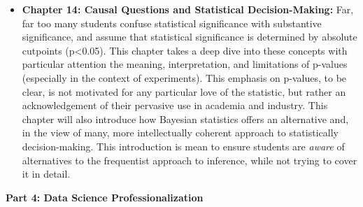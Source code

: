 \documentclass[12pt]{article}
\begin{document}
\begin{itemize}
{  Deployment:} One of the hardest parts of answering Causal Questions is
  that data scientists are called in to answer them in contexts where
  the stakes are too high to try things at a large scale. This chapter
  focuses on the issues of external validity --- such as general
  equilibrium effects, novelty and primacy effects, etc. --- that arise
  when one attempts to generalize the results of causal analyses. This
  section is of particular interest to data scientists, many of whom
  have the privilege of working at companies with A/B testing
  infrastructure that radically simplifies the challenge of ensuring
  high internal validity, and who are likely to have had internal
  validity emphasized in courses.
\item
  \textbf{Chapter 14: Causal Questions and Statistical Decision-Making:}
  Far, far too many students confuse statistical significance with
  substantive significance, and assume that statistical significance is
  determined by absolute cutpoints (p\textless0.05). This chapter takes
  a deep dive into these concepts with particular attention the meaning,
  interpretation, and limitations of p-values (especially in the context
  of experiments). This emphasis on p-values, to be clear, is not
  motivated for any particular love of the statistic, but rather an
  acknowledgement of their pervasive use in academia and industry. This
  chapter will also introduce how Bayesian statistics offers an
  alternative and, in the view of many, more intellectually coherent
  approach to statistically decision-making. This introduction is mean
  to ensure students are \emph{aware} of alternatives to the frequentist
  approach to inference, while not trying to cover it in detail.
\end{itemize}

\textbf{Part 4: Data Science Professionalization}
\end{document}
